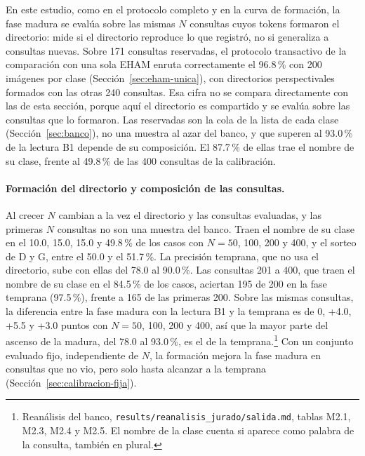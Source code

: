 En este estudio, como en el protocolo completo y en la curva de formación, la fase
madura se evalúa sobre las mismas $N$ consultas cuyos tokens formaron el directorio:
mide si el directorio reproduce lo que registró, no si generaliza a consultas nuevas.
Sobre 171 consultas reservadas, el protocolo transactivo de la comparación con una sola
EHAM enruta correctamente el 96.8\,\% con 200 imágenes por clase
(Sección~\ref{sec:eham-unica}), con directorios perspectivales formados con las otras
240 consultas.
Esa cifra no se compara directamente con las de esta sección, porque aquí el directorio
es compartido y se evalúa sobre las consultas que lo formaron.
Las reservadas son la cola de la lista de cada clase (Sección~\ref{sec:banco}), no una
muestra al azar del banco, y que superen al 93.0\,\% de la lectura B1 depende de su
composición.
El 87.7\,\% de ellas trae el nombre de su clase, frente al 49.8\,\% de las 400
consultas de la calibración.

\paragraph{Formación del directorio y composición de las consultas.}
Al crecer $N$ cambian a la vez el directorio y las consultas evaluadas, y las primeras
$N$ consultas no son una muestra del banco.
Traen el nombre de su clase en el 10.0, 15.0, 15.0 y 49.8\,\% de los casos con
$N = 50$, 100, 200 y 400, y el sorteo de D y G, entre el 50.0 y el 51.7\,\%.
La precisión temprana, que no usa el directorio, sube con ellas del 78.0 al 90.0\,\%.
Las consultas 201 a 400, que traen el nombre de su clase en el 84.5\,\% de los casos,
aciertan 195 de 200 en la fase temprana (97.5\,\%), frente a 165 de las primeras 200.
Sobre las mismas consultas, la diferencia entre la fase madura con la lectura B1 y la
temprana es de 0, +4.0, +5.5 y +3.0 puntos con $N = 50$, 100, 200 y 400, así que la
mayor parte del ascenso de la madura, del 78.0 al 93.0\,\%, es el de la
temprana.\footnote{Reanálisis del banco,
\texttt{results/reanalisis\_jurado/salida.md}, tablas M2.1, M2.3, M2.4 y M2.5. El nombre
de la clase cuenta si aparece como palabra de la consulta, también en plural.}
Con un conjunto evaluado fijo, independiente de $N$, la formación mejora la fase madura
en consultas que no vio, pero solo hasta alcanzar a la temprana
(Sección~\ref{sec:calibracion-fija}).


